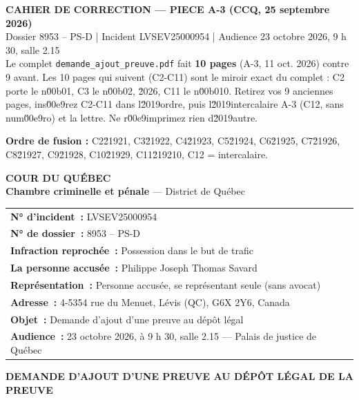 \documentclass[12pt,a4paper]{article}
\begin{document}
\thispagestyle{empty}
\begin{center}
{\large\bfseries CAHIER DE CORRECTION --- PIECE A-3 (CCQ, 25 septembre 2026)}\\[4pt]
Dossier 8953 -- PS-D \;|\; Incident LVSEV25000954 \;|\; Audience 23 octobre 2026, 9 h 30, salle 2.15\\[2pt]
{\small Le complet \texttt{demande\_ajout\_preuve.pdf} fait \textbf{10 pages} (A-3, 11 oct. 2026) contre 9 avant. Les 10 pages qui suivent (C2-C11) sont le miroir exact du complet : C2 porte le n\u00b01, C3 le n\u00b02, \u2026, C11 le n\u00b010. Retirez vos 9 anciennes pages, ins\u00e9rez C2-C11 dans l\u2019ordre, puis l\u2019intercalaire A-3 (C12, sans num\u00e9ro) et la lettre. Ne r\u00e9imprimez rien d\u2019autre.}
\end{center}
\vspace{4pt}
\noindent\textbf{Ordre de fusion : } C2\u21921, C3\u21922, C4\u21923, C5\u21924, C6\u21925, C7\u21926, C8\u21927, C9\u21928, C10\u21929, C11\u219210, C12 = intercalaire.\newpage
\setcounter{page}{1}

\begin{center}
{\large\bfseries COUR DU QUÉBEC}\\[2pt]
{\bfseries Chambre criminelle et pénale} — District de Québec
\end{center}
\vspace{4pt}

\noindent\begin{tabular}{@{}p{\textwidth}@{}}
\noindent\textbf{N° d’incident~:} LVSEV25000954\\[2pt]
\noindent\textbf{N° de dossier~:} 8953 – PS-D\\[2pt]
\noindent\textbf{Infraction reprochée~:} Possession dans le but de trafic\\[2pt]
\noindent\textbf{La personne accusée~:} Philippe Joseph Thomas Savard\\[2pt]
\noindent\textbf{Représentation~:} Personne accusée, se représentant seule (sans avocat)\\[2pt]
\noindent\textbf{Adresse~:} 4-5354 rue du Menuet, Lévis (QC), G6X 2Y6, Canada\\[2pt]
\noindent\textbf{Objet~:} Demande d’ajout d’une preuve au dépôt légal\\[2pt]
\noindent\textbf{Audience~:} 23 octobre 2026, à 9 h 30, salle 2.15 — Palais de justice de Québec\\[2pt]
\end{tabular}


\vspace{6pt}
\begin{center}
{\bfseries DEMANDE D’AJOUT D’UNE PREUVE AU DÉPÔT LÉGAL DE LA PREUVE}
\end{center}
\vspace{2pt}
\end{document}
